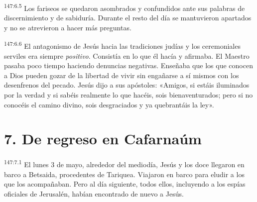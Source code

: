\par 
\textsuperscript{147:6.5} Los fariseos se quedaron asombrados y confundidos ante sus palabras de discernimiento y de sabiduría. Durante el resto del día se mantuvieron apartados y no se atrevieron a hacer más preguntas.

\par 
\textsuperscript{147:6.6} El antagonismo de Jesús hacia las tradiciones judías y los ceremoniales serviles era siempre \textit{positivo}. Consistía en lo que él hacía y afirmaba. El Maestro pasaba poco tiempo haciendo denuncias negativas. Enseñaba que los que conocen a Dios pueden gozar de la libertad de vivir sin engañarse a sí mismos con los desenfrenos del pecado. Jesús dijo a sus apóstoles: «Amigos, si estáis iluminados por la verdad y si sabéis realmente lo que hacéis, sois bienaventurados; pero si no conocéis el camino divino, sois desgraciados y ya quebrantáis la ley».

\section*{7. De regreso en Cafarnaúm}
\par 
\textsuperscript{147:7.1} El lunes 3 de mayo, alrededor del mediodía, Jesús y los doce llegaron en barco a Betsaida, procedentes de Tariquea. Viajaron en barco para eludir a los que los acompañaban. Pero al día siguiente, todos ellos, incluyendo a los espías oficiales de Jerusalén, habían encontrado de nuevo a Jesús.

